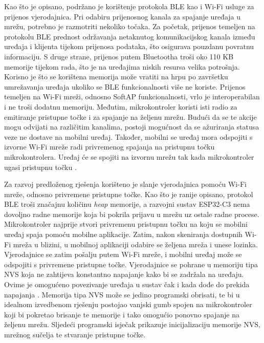 Kao što je opisano, podržano je korištenje protokola BLE kao i Wi-Fi usluge za prijenos vjerodajnica. Pri odabiru prijenosnog kanala za spajanje uređaja u mrežu, potrebno je razmotriti nekoliko točaka. Za početak, prijenos temeljen na protokolu BLE prednost održavanja netaknutog komunikacijskog kanala između uređaja i klijenta tijekom prijenosa podataka, što osigurava pouzdanu povratnu informaciju. S druge strane, prijenos putem Bluetootha troši oko 110 KB memorije tijekom rada, što je na uređajima niskih resursa velika potrošnja. Korisno je što se korištena memorija može vratiti na hrpu  po završetku umrežavanja uređaja ukoliko se BLE funkcionalnosti više ne koriste. Prijenos temeljen na Wi-Fi mreži, odnosno SoftAP funkcionalnosti, vrlo je interoperabilan i ne troši dodatnu memoriju. Međutim, mikrokontroler koristi isti radio za emitiranje pristupne točke i za spajanje na željenu mrežu. Budući da se te akcije mogu odvijati na različitim kanalima, postoji mogućnost da se ažuriranja statusa veze ne dostave na mobilni uređaj. Također, mobilni se uređaj mora odspojiti s izvorne Wi-Fi mreže radi privremenog spajanja na pristupnu točku mikrokontrolera. Uređaj će se spojiti na izvornu mrežu tak kada mikrokontroler ugasi pristupnu točku \cite{unified_provisioning}. 

Za razvoj predloženog rješenja korišteno je slanje vjerodajnica pomoću Wi-Fi mreže, odnosno privremene pristupne točke. Kao što je ranije opisano, protokol BLE troši značajnu količinu \textit{heap} memorije, a razvojni sustav ESP32-C3 nema dovoljno radne memorije koja bi pokrila prijavu u mrežu uz ostale radne procese. Mikrokontroler najprije stvori privremenu pristupnu točku na koju se mobilni uređaj spaja pomoću mobilne aplikacije. Zatim, nakon skeniranja dostupnih Wi-Fi mreža u blizini, u mobilnoj aplikaciji odabire se željena mreža i unese lozinka. Vjerodajnice se zatim pošalju putem Wi-Fi mreže, i mobilni uređaj može se odspojiti s privremene pristupne točke. Vjerodajnice se pohrane u memoriju tipa NVS  koja ne zahtijeva konstantno napajanje kako bi se zadržala na uređaju. Ovime je omogućeno povezivanje uređaja u sustav čak i kada dođe do prekida napajanja \cite{what_is_nvs}. Memorija tipa NVS može se jedino programski obrisati, te bi u idealnom izvedbenom rješenju postojao vanjski gumb spojen na mikrokontroler koji bi pokretao brisanje te memorije i tako omogućio ponovno spajanje na željenu mrežu. Sljedeći programski isječak prikazuje inicijalizaciju memorije NVS, mrežnog sučelja te stvaranje pristupne točke.

